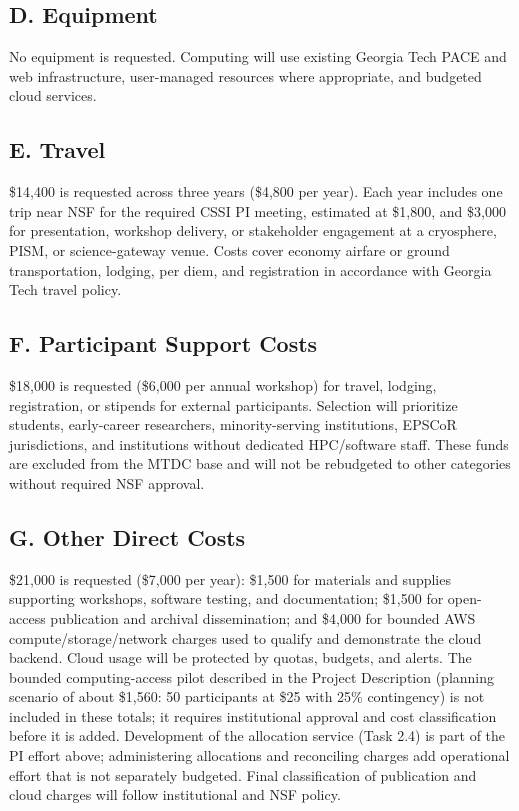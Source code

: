 \subsection*{D. Equipment}

No equipment is requested. Computing will use existing Georgia Tech PACE and
web infrastructure, user-managed resources where appropriate, and budgeted
cloud services.

\subsection*{E. Travel}

\$14,400 is requested across three years (\$4,800 per year). Each year includes
one trip near NSF for the required CSSI PI meeting, estimated at \$1,800, and
\$3,000 for presentation, workshop delivery, or stakeholder engagement at a
cryosphere, PISM, or science-gateway venue. Costs cover economy airfare or
ground transportation, lodging, per diem, and registration in accordance with
Georgia Tech travel policy.

\subsection*{F. Participant Support Costs}

\$18,000 is requested (\$6,000 per annual workshop) for travel, lodging,
registration, or stipends for external participants. Selection will prioritize
students, early-career researchers, minority-serving institutions, EPSCoR
jurisdictions, and institutions without dedicated HPC/software staff. These
funds are excluded from the MTDC base and will not be rebudgeted to other
categories without required NSF approval.

\subsection*{G. Other Direct Costs}

\$21,000 is requested (\$7,000 per year): \$1,500 for materials and supplies
supporting workshops, software testing, and documentation; \$1,500 for
open-access publication and archival dissemination; and \$4,000 for bounded
AWS compute/storage/network charges used to qualify and demonstrate the cloud
backend. Cloud usage will be protected by quotas, budgets, and alerts. The
bounded computing-access pilot described in the Project Description (planning
scenario of about \$1,560: 50 participants at \$25 with 25\% contingency) is
not included in these totals; it requires institutional approval and cost
classification before it is added. Development of the allocation service
(Task 2.4) is part of the PI effort above; administering allocations and
reconciling charges add operational effort that is not separately budgeted. Final
classification of publication and cloud charges will follow institutional and
NSF policy.

